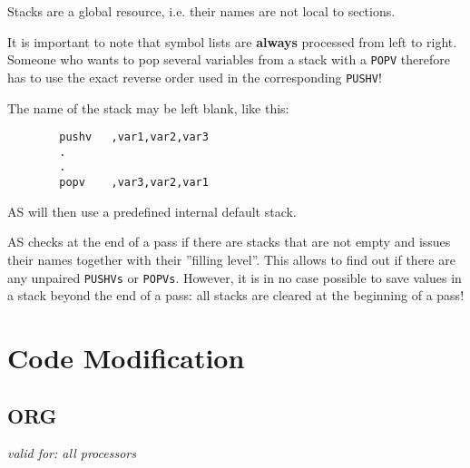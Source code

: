 \documentclass[12pt,twoside]{report}
\makeatletter
\newcommand{\bb}[1]{{\bf #1}}
\newcommand{\tty}[1]{{\tt #1}}
\newcommand{\ttindex}[1]{\index{#1@{\tt #1}}}
\makeatother
\begin{document}
Stacks are a global resource, i.e. their names are not local to
sections.

It is important to note that symbol lists are \bb{always} processed from
left to right.  Someone who wants to pop several variables from a stack
with a \tty{POPV} therefore has to use the exact reverse order used in the
corresponding \tty{PUSHV}!

The name of the stack may be left blank, like this:
\begin{verbatim}
        pushv   ,var1,var2,var3
        .
        .
        popv    ,var3,var2,var1
\end{verbatim}
AS will then use a predefined internal default stack.

AS checks at the end of a pass if there are stacks that are not empty and
issues their names together with their ''filling level''.  This allows to
find out if there are any unpaired \tty{PUSHVs} or \tty{POPVs}.  However,
it is in no case possible to save values in a stack beyond the end of a
pass: all stacks are cleared at the beginning of a pass!


\section{Code Modification}


\subsection{ORG}
\label{SectORG}
\ttindex{ORG}

{\em valid for: all processors}
\end{document}
